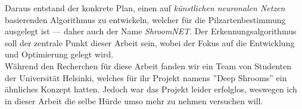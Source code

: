  Daraus entstand der konkrete Plan, einen auf \textit{künstlichen neuronalen Netzen} basierenden Algorithmus zu entwickeln, welcher für die Pilzartenbestimmung ausgelegt ist --- daher auch der Name \textit{ShroomNET}. Der Erkennungsalgorithmus soll der zentrale Punkt dieser Arbeit sein, wobei der Fokus auf die Entwicklung und Optimierung gelegt wird.\\
 
 Während den Recherchen für diese Arbeit fanden wir ein Team von Studenten der Universität Helsinki, welches für ihr Projekt namens ''Deep Shrooms''\cite{deepshroom} ein ähnliches Konzept hatten. Jedoch war das Projekt leider erfolglos, weswegen ich in dieser Arbeit die selbe Hürde umso mehr zu nehmen versuchen will.
 
 
 